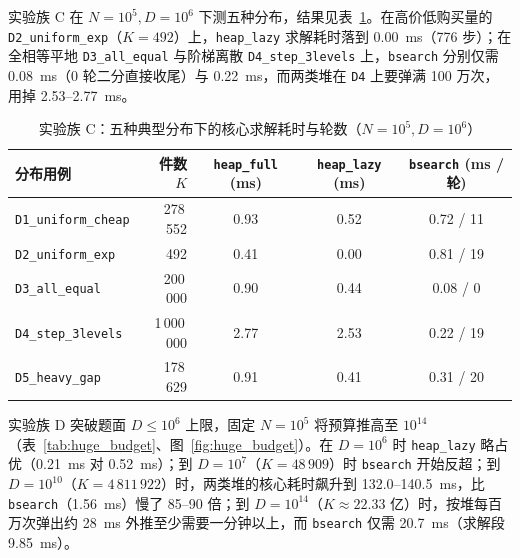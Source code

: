\documentclass[12pt,a4paper,fontset=windows]{ctexart}
\theoremstyle{plain}
\newcommand{\code}[1]{\texttt{#1}}
\newcommand{\tabhead}[1]{\textbf{#1}}
\begin{document}
实验族 C 在 $N=10^5, D=10^6$ 下测五种分布，结果见表~\ref{tab:dist}。在高价低购买量的 \code{D2\_uniform\_exp}（$K=492$）上，\code{heap\_lazy} 求解耗时落到 0.00~ms（776 步）；在全相等平地 \code{D3\_all\_equal} 与阶梯离散 \code{D4\_step\_3levels} 上，\code{bsearch} 分别仅需 0.08~ms（0 轮二分直接收尾）与 0.22~ms，而两类堆在 \code{D4} 上要弹满 100 万次，用掉 2.53--2.77~ms。

\begin{table}[htbp]
\centering
\caption{实验族 C：五种典型分布下的核心求解耗时与轮数（$N=10^5, D=10^6$）}
\label{tab:dist}
\footnotesize
\begin{tabular}{@{}lrccc@{}}
\toprule
\rowcolor{gray!12}\tabhead{分布用例} & \tabhead{件数 $K$} & \tabhead{\code{heap\_full} (ms)} & \tabhead{\code{heap\_lazy} (ms)} & \tabhead{\code{bsearch} (ms / 轮)} \\
\midrule
\code{D1\_uniform\_cheap} & 278\,552   & 0.93 & 0.52 & 0.72 / 11 \\
\code{D2\_uniform\_exp}   & 492        & 0.41 & 0.00 & 0.81 / 19 \\
\code{D3\_all\_equal}     & 200\,000   & 0.90 & 0.44 & 0.08 / 0 \\
\code{D4\_step\_3levels}  & 1\,000\,000 & 2.77 & 2.53 & 0.22 / 19 \\
\code{D5\_heavy\_gap}     & 178\,629   & 0.91 & 0.41 & 0.31 / 20 \\
\bottomrule
\end{tabular}
\end{table}

实验族 D 突破题面 $D \le 10^6$ 上限，固定 $N=10^5$ 将预算推高至 $10^{14}$（表~\ref{tab:huge_budget}、图~\ref{fig:huge_budget}）。在 $D=10^6$ 时 \code{heap\_lazy} 略占优（0.21~ms 对 0.52~ms）；到 $D=10^7$（$K=48\,909$）时 \code{bsearch} 开始反超；到 $D=10^{10}$（$K=4\,811\,922$）时，两类堆的核心耗时飙升到 132.0--140.5~ms，比 \code{bsearch}（1.56~ms）慢了 85--90 倍；到 $D=10^{14}$（$K \approx 22.33$ 亿）时，按堆每百万次弹出约 28~ms 外推至少需要一分钟以上，而 \code{bsearch} 仅需 20.7~ms（求解段 9.85~ms）。
\end{document}
